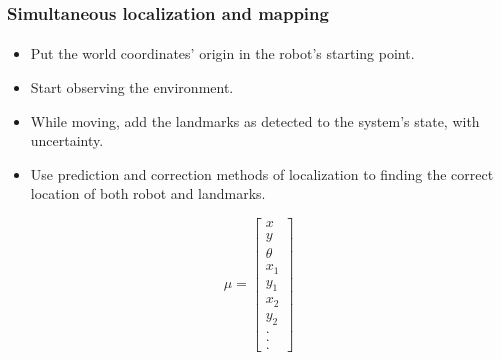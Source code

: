 \documentclass{beamer}
\begin{document}
	\begin{frame}
		\frametitle{Simultaneous localization and mapping}
		
		\framesubtitle{}

		\begin{itemize}
			\item Put the world coordinates’ origin in the robot's starting point.
			\item Start observing the environment.
			\item While moving, add the landmarks as detected to the system’s state, with uncertainty.
			\item Use prediction and correction methods of localization to finding the correct location of both robot and landmarks.
		\end{itemize}
		\begin{equation*}
			\mu=
			\begin{bmatrix}
				x\\y\\\theta\\x_1\\y_1\\x_2\\y_2\\.\\.\\.
			\end{bmatrix}
		\end{equation*}

	\end{frame}
\end{document}
